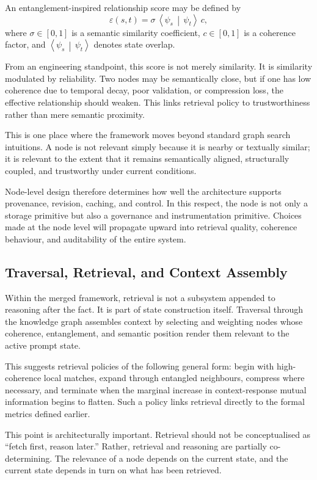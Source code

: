 \documentclass[12pt]{article}
\newcommand{\braket}[2]{\left\langle#1\,\middle|\,#2\right\rangle}
\begin{document}
An entanglement-inspired relationship score may be defined by
\begin{equation}
\varepsilon(s,t) = \sigma\,\braket{\psi_s}{\psi_t}\,c,
\end{equation}
where $\sigma \in [0,1]$ is a semantic similarity coefficient, $c \in [0,1]$ is a coherence factor, and $\braket{\psi_s}{\psi_t}$ denotes state overlap.

From an engineering standpoint, this score is not merely similarity. It is similarity modulated by reliability. Two nodes may be semantically close, but if one has low coherence due to temporal decay, poor validation, or compression loss, the effective relationship should weaken. This links retrieval policy to trustworthiness rather than mere semantic proximity.

This is one place where the framework moves beyond standard graph search intuitions. A node is not relevant simply because it is nearby or textually similar; it is relevant to the extent that it remains semantically aligned, structurally coupled, and trustworthy under current conditions.

Node-level design therefore determines how well the architecture supports provenance, revision, caching, and control. In this respect, the node is not only a storage primitive but also a governance and instrumentation primitive. Choices made at the node level will propagate upward into retrieval quality, coherence behaviour, and auditability of the entire system.

\subsection{Traversal, Retrieval, and Context Assembly}
Within the merged framework, retrieval is not a subsystem appended to reasoning after the fact. It is part of state construction itself. Traversal through the knowledge graph assembles context by selecting and weighting nodes whose coherence, entanglement, and semantic position render them relevant to the active prompt state.

This suggests retrieval policies of the following general form: begin with high-coherence local matches, expand through entangled neighbours, compress where necessary, and terminate when the marginal increase in context-response mutual information begins to flatten. Such a policy links retrieval directly to the formal metrics defined earlier.

This point is architecturally important. Retrieval should not be conceptualised as ``fetch first, reason later.'' Rather, retrieval and reasoning are partially co-determining. The relevance of a node depends on the current state, and the current state depends in turn on what has been retrieved.
\end{document}
